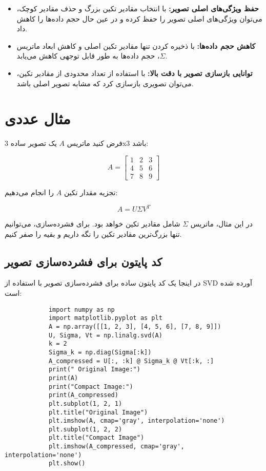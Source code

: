 \begin{itemize}
	\item \textbf{حفظ ویژگی‌های اصلی تصویر:} با انتخاب مقادیر تکین بزرگ و حذف مقادیر کوچک، می‌توان ویژگی‌های اصلی تصویر را حفظ کرده و در عین حال حجم داده‌ها را کاهش داد.
	\item \textbf{کاهش حجم داده‌ها:} با ذخیره کردن تنها مقادیر تکین اصلی و کاهش ابعاد ماتریس \(\Sigma\)، حجم داده‌ها به طور قابل توجهی کاهش می‌یابد.
	\item \textbf{توانایی بازسازی تصویر با دقت بالا:} با استفاده از تعداد محدودی از مقادیر تکین، می‌توان تصویری بازسازی کرد که مشابه تصویر اصلی باشد.
\end{itemize}

\section{مثال عددی}

فرض کنید ماتریس \(A\) یک تصویر ساده 3x3 باشد:

\[
A = \begin{bmatrix}
	1 & 2 & 3 \\
	4 & 5 & 6 \\
	7 & 8 & 9
\end{bmatrix}
\]

تجزیه مقدار تکین \(A\) را انجام می‌دهیم:

\[
A = U \Sigma V^T
\]

در این مثال، ماتریس \(\Sigma\) شامل مقادیر تکین خواهد بود. برای فشرده‌سازی، می‌توانیم تنها بزرگ‌ترین مقادیر تکین را نگه داریم و بقیه را صفر کنیم.

\subsection{کد پایتون برای فشرده‌سازی تصویر}

در اینجا یک کد پایتون ساده برای فشرده‌سازی تصویر با استفاده از SVD آورده شده است:
\begin{code}
	\begin{latin}
		\begin{lstlisting}
			import numpy as np
			import matplotlib.pyplot as plt
			A = np.array([[1, 2, 3], [4, 5, 6], [7, 8, 9]])
			U, Sigma, Vt = np.linalg.svd(A)
			k = 2
			Sigma_k = np.diag(Sigma[:k])
			A_compressed = U[:, :k] @ Sigma_k @ Vt[:k, :]
			print(" Original Image:")
			print(A)
			print("Compact Image:")
			print(A_compressed)
			plt.subplot(1, 2, 1)
			plt.title("Original Image")
			plt.imshow(A, cmap='gray', interpolation='none')
			plt.subplot(1, 2, 2)
			plt.title("Compact Image")
			plt.imshow(A_compressed, cmap='gray', interpolation='none')
			plt.show()
		\end{lstlisting}
	\end{latin}
\end{code}

